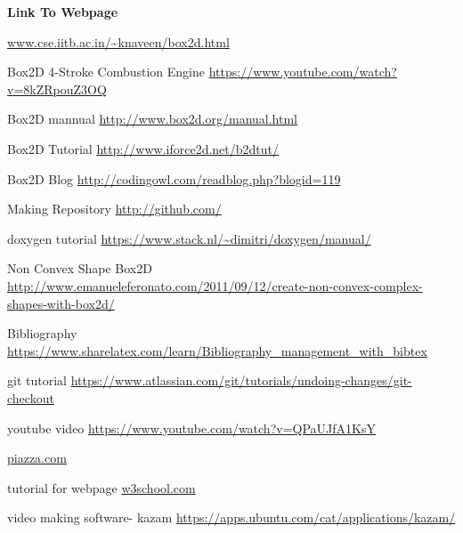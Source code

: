 \documentclass[40pt]{article}
\begin{document}
\begin{center}

\huge{
\textbf{Link To Webpage\\}}
\end{center}
\Large
{
\url{www.cse.iitb.ac.in/~knaveen/box2d.html}
}




\begin{thebibliography}{9}
Box2D 4-Stroke Combustion Engine
\url{https://www.youtube.com/watch?v=8kZRpouZ3OQ}

Box2D mannual
\url{http://www.box2d.org/manual.html}

Box2D Tutorial
\url{http://www.iforce2d.net/b2dtut/}

Box2D Blog
\url{http://codingowl.com/readblog.php?blogid=119}

Making Repository
\url{http://github.com/}

doxygen tutorial
\url{https://www.stack.nl/~dimitri/doxygen/manual/}

Non Convex Shape Box2D
\url{http://www.emanueleferonato.com/2011/09/12/create-non-convex-complex-shapes-with-box2d/}

Bibliography
\url{https://www.sharelatex.com/learn/Bibliography_management_with_bibtex}

git tutorial
\url{https://www.atlassian.com/git/tutorials/undoing-changes/git-checkout}

youtube video
\url{https://www.youtube.com/watch?v=QPaUJfA1KsY}

\url{piazza.com}

tutorial for webpage
\url{w3school.com}

video making software- kazam
\url{https://apps.ubuntu.com/cat/applications/kazam/}












\end{thebibliography}
\end{document}
